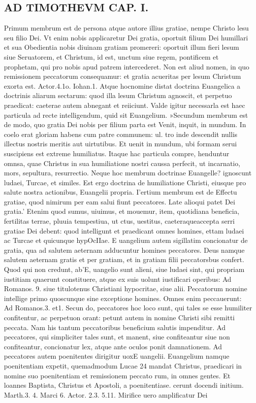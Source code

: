 \documentclass{article}
\begin{document}
\begin{pages}
\section*{AD TIMOTHEVM CAP. I. }
\marginpar{[ p.50 ]}\pstart Primum membrum est de persona atque  autore illius gratiae, nempe Christo lesu seu filio Dei. Vt enim nobis applicaretur Dei gratia, oportuit filium Dei humillari et sua Obedientia nobis diuinam gratiam promereri: oportuit illum fieri lesum siue Seruatorem, et Christum, id est, unctum siue regem, pontificem et prophetam, qui pro nobis apud patrem intercederet. Non est aliud nomen, in quo remissionem peccatorum consequamur: et gratia acueritas per lesum Christum exorta est. Actor.4.1o. Iohan.1. Atque hocnomine distat doctrina Euangelica a doctrinis aliarum sectarum: quod illa lesum Christum agnoscit, et perpetuo praedicat: caeterae autem abnegant et reiiciunt. Valde igitur necessarla est haec particula ad recte intelligendum, quid sit Euangelium.  \pend\pstart »Secundum membrum est de modo, quo gratia Dei nobis per filium parta est Venit, inquit, in mundum. In coelo erat gloriam habens cum patre communem: ul. tro inde descendit nullis illectus nostris meritis aut uirtutibus. Et uenit in mundum, ubi formam serui suscipiens est extreme humiliatus. Itaque hac particula compre, henduntur omnsa, quae Christus in sua humiliatione nostri caussa perfecit, ut incarnatio, mors, sepultura, resurrectio. Neque hoc membrum doctrinae Euangelle? ignoscunt ludaei, Turcae, et similes. Est ergo doctrina de humiliatione Christi, eiusque  pro salute nostra actionibus, Euangelii propria.  \pend\pstart I’ertium membrum est de Effectu gratiae, quod nimirum per eam salui fiunt peccatores. Late alioqui patet Dei gratia.' Etenim quod sumus, uiuimus, et mouemur, item, quotidiana beneficia, fertilitas terrae, pluuia tempestiua, ut ctus, uestitus, caeteraqueaccepta serri gratiae Dei debent: quod intelligunt et praedicant omnes homines, ettam ludaei ac Turcae et quicunque hypOcIIae. E uangelium autem sigillatim concionatur de gratia, qua ad salutem aeternam adducuntur homines peccatores. Deus namque salutem aeternam gratis et per gratiam, et in gratiam filii peccatorsbus confert. Quod qui non credunt, ab’E, uangelio sunt alieni, siue ludaei sint, qui propriam iustitiam quaerunt constituere, atque ex suis uolunt iustificari operibus: Ad Romanos. 9. siue titulotenus Christiani hypocritae, siue alii. Peccatorum nomine intellige primo quoscunque sine exceptione homines. Omnes enim peccauerunt: Ad Romanos.3. et1. Secun do, peccatores hoc loco sunt, qui tales se esse humiliter confitentur, ac perpetuon orant: petunt autem in nomine Christi sibi remitti peccata. Nam his tantum peccatoribus beneficium salutis impenditur. Ad peccatores, qui simpliciter tales sunt, et manent, siue confiteantur siue non confiteantur, concionatur lex, atque ante oculos ponit damnationem. Ad peccatores autem poenitentes dirigitur uoxE uangelii. Euangelium namque poenitentiam expetit, quemadmodum Lucae 24 mandat Christus, praedicari in nomine suo poenitentiam et remissionem peccato rum, in omnes gentes. Et loannes Baptista, Christus et Apostoli, a poenitentiase. cerunt docendi initium. Marth.3. 4. Marci 6. Actor. 2.3. 5.11. Mirifice uero amplificatur Dei 
\end{pages}
\end{document}
